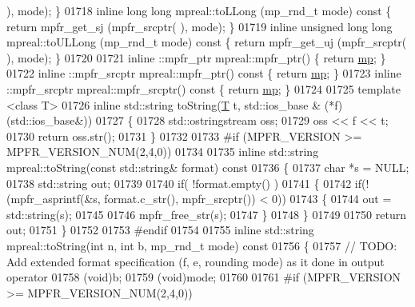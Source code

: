 \begin{DoxyCode}
      ), mode);    \}
01718 \textcolor{keyword}{inline} \textcolor{keywordtype}{long} \textcolor{keywordtype}{long}          mpreal::toLLong  (mp\_rnd\_t mode)\textcolor{keyword}{  const    }\{    \textcolor{keywordflow}{return}  mpfr\_get\_sj (mpfr\_srcptr(
      ), mode);    \}
01719 \textcolor{keyword}{inline} \textcolor{keywordtype}{unsigned} \textcolor{keywordtype}{long} \textcolor{keywordtype}{long} mpreal::toULLong (mp\_rnd\_t mode)\textcolor{keyword}{  const    }\{    \textcolor{keywordflow}{return}  mpfr\_get\_uj (mpfr\_srcptr(
      ), mode);    \}
01720 
01721 inline ::mpfr\_ptr     mpreal::mpfr\_ptr()             \{ \textcolor{keywordflow}{return} \hyperlink{namespaceboost_1_1multiprecision}{mp}; \}
01722 inline ::mpfr\_srcptr  mpreal::mpfr\_ptr()\textcolor{keyword}{    const    }\{ \textcolor{keywordflow}{return} \hyperlink{namespaceboost_1_1multiprecision}{mp}; \}
01723 inline ::mpfr\_srcptr  mpreal::mpfr\_srcptr()\textcolor{keyword}{ const    }\{ \textcolor{keywordflow}{return} \hyperlink{namespaceboost_1_1multiprecision}{mp}; \}
01724 
01725 \textcolor{keyword}{template} <\textcolor{keyword}{class} T>
01726 \textcolor{keyword}{inline} std::string toString(\hyperlink{group___sparse_core___module}{T} t, std::ios\_base & (*f)(std::ios\_base&))
01727 \{
01728     std::ostringstream oss;
01729     oss << f << t;
01730     \textcolor{keywordflow}{return} oss.str();
01731 \}
01732 
01733 \textcolor{preprocessor}{#if (MPFR\_VERSION >= MPFR\_VERSION\_NUM(2,4,0))}
01734 
01735 \textcolor{keyword}{inline} std::string mpreal::toString(\textcolor{keyword}{const} std::string& format)\textcolor{keyword}{ const}
01736 \textcolor{keyword}{}\{
01737     \textcolor{keywordtype}{char} *s = NULL;
01738     std::string out;
01739 
01740     \textcolor{keywordflow}{if}( !format.empty() )
01741     \{
01742         \textcolor{keywordflow}{if}(!(mpfr\_asprintf(&s, format.c\_str(), mpfr\_srcptr()) < 0))
01743         \{
01744             out = std::string(s);
01745 
01746             mpfr\_free\_str(s);
01747         \}
01748     \}
01749 
01750     \textcolor{keywordflow}{return} out;
01751 \}
01752 
01753 \textcolor{preprocessor}{#endif}
01754 
01755 \textcolor{keyword}{inline} std::string mpreal::toString(\textcolor{keywordtype}{int} n, \textcolor{keywordtype}{int} b, mp\_rnd\_t mode)\textcolor{keyword}{ const}
01756 \textcolor{keyword}{}\{
01757     \textcolor{comment}{// TODO: Add extended format specification (f, e, rounding mode) as it done in output operator}
01758     (void)b;
01759     (void)mode;
01760 
01761 \textcolor{preprocessor}{#if (MPFR\_VERSION >= MPFR\_VERSION\_NUM(2,4,0))}

\end{DoxyCode}
